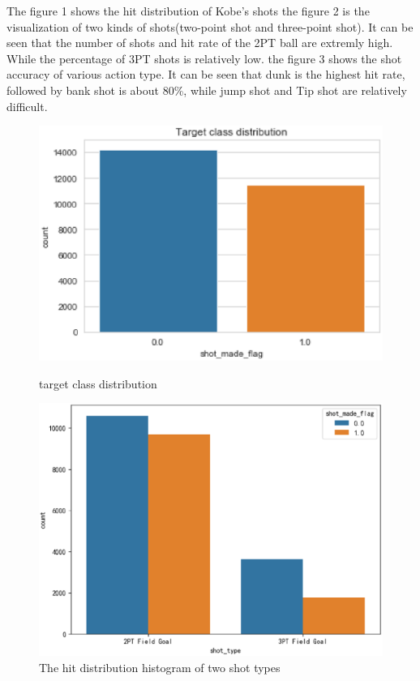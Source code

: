 The figure 1
shows the hit distribution of Kobe's shots  
the figure 2
is the visualization of two kinds of shots(two-point shot and three-point shot).
It can be seen that the number of shots and hit rate of the 2PT ball are extremly high. 
While the percentage of 3PT shots is relatively low.
the figure 3 
shows the shot accuracy of various action type.
It can be seen that dunk is the highest hit rate, followed by bank shot is about 80\%,
while jump shot and Tip shot are relatively difficult.
\newpage

\begin{figure}[H]

		\centering
		\includegraphics[scale=0.55]{c.eps}
		\caption{target class distribution}


		\centering
		\includegraphics[scale=0.3]{d.eps}
		\caption{The hit distribution histogram of two shot types}


\end{figure}
